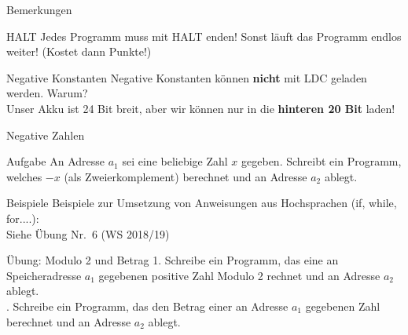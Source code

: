 \begin{frame}{Bemerkungen}

	\begin{block}{HALT}
		Jedes Programm muss mit HALT enden! Sonst läuft das Programm endlos weiter! (Kostet dann Punkte!)
	\end{block}
	
    \pause
    
	\begin{block}{Negative Konstanten}
		Negative Konstanten können \textbf{nicht} mit LDC geladen werden. Warum? \\
		\pause \impl Unser Akku ist 24 Bit breit, aber wir können nur in die \textbf{hinteren 20 Bit} laden!
	\end{block}
\end{frame}

\begin{frame}{Negative Zahlen}
	\begin{block}{Aufgabe}
		An Adresse $a_1$ sei eine beliebige Zahl $x$ gegeben. Schreibt ein Programm, welches $-x$ (als Zweierkomplement) berechnet und an Adresse $a_2$ ablegt.
	\end{block}

\end{frame}

\begin{frame}{Beispiele}
	Beispiele zur Umsetzung von Anweisungen aus Hochsprachen (if, while, for....):\\
	\bigskip
	Siehe Übung Nr.~6 (WS 2018/19)
\end{frame}

\begin{frame}{Übung: Modulo 2 und Betrag}
	1. Schreibe ein Programm, das eine an Speicheradresse $a_1$ gegebenen positive Zahl Modulo 2 rechnet und an Adresse $a_2$ ablegt. \\
	. Schreibe ein Programm, das den Betrag einer an Adresse $a_1$ gegebenen Zahl berechnet und an Adresse $a_2$ ablegt.
\end{frame}

